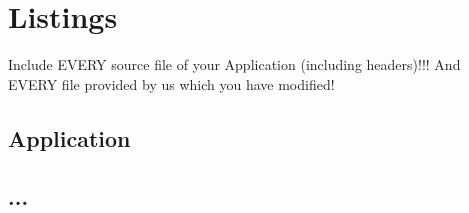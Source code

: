\section{Listings}
\small{

Include EVERY source file of your Application (including headers)!!!
And EVERY file provided by us which you have modified!

\subsection{Application}




\subsection{...}



}%
